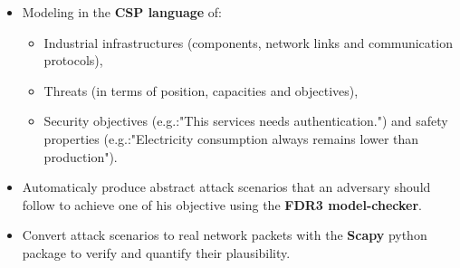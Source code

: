 \documentclass{beamer}
\newcommand{\eg}{e.g.:\xspace}
\begin{document}
\begin{frame}[fragile]{}
\begin{tcolorbox}[adjusted title={\centering\large Formal Analysis of Industrial Protocols}]
\begin{columns}[T]
\begin{column}{.65\textwidth}
\begin{tcolorbox}
                \end{tcolorbox}
            \end{column}
        \end{columns}
    \end{tcolorbox}
    \vspace{.25em}
    \begin{tcolorbox}[adjusted title={\centering\large Smart-Fuzzing of Industrial Systems}]
        \vspace{.5em}
        \begin{columns}[T]
            \begin{column}{.35\textwidth}
                \begin{tcolorbox}[
                colback=white, %
                colframe=normalTitleBlockColor, %
                colframe=gray!20, %
                boxrule=1mm,
                coltext=black, %
                coltitle=black, %
                bottom=2mm,
                equal height group=C,
                valign = center,
                adjusted title={\large Objectives}]
                    \vspace{.5em}
                    \begin{itemize}
                        \item Modeling in the {\bf CSP language} of:
                        \begin{itemize}
                            \item Industrial infrastructures (components, network links and communication protocols),
                            \item Threats (in terms of position, capacities and objectives),
                            \item Security objectives (\eg "This services needs authentication.") and safety properties (\eg "Electricity consumption always remains lower than production").
                        \end{itemize}
                        \item Automaticaly produce abstract attack scenarios that an adversary should follow to achieve one of his objective using the {\bf FDR3 model-checker}.
                        \item Convert attack scenarios to real network packets with the {\bf Scapy} python package to verify and quantify their plausibility.
                    \end{itemize}

\end{tcolorbox}
\end{column}
\end{columns}
\end{tcolorbox}
\end{frame}
\end{document}
